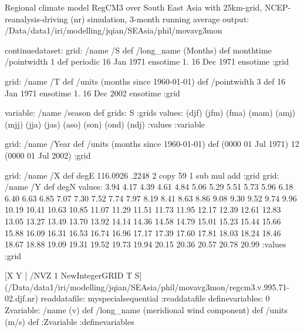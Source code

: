 Regional climate model RegCM3 over South East Asia  with 25km-grid,  NCEP-reanalysis-driving (nr) simulation, 3-month running average output:
/Data/data1/iri/modelling/jqian/SEAsia/phil/movavg3mon
\begin{ingrid}
continuedataset:
grid:
/name /S def
/long_name (Months) def
monthtime
/pointwidth 1 def
periodic
16 Jan 1971 ensotime
1.
16 Dec 1971 ensotime
:grid

grid:
/name /T def
/units (months since 1960-01-01) def
/pointwidth 3 def
16 Jan 1971 ensotime
1.
16 Dec 2002 ensotime
:grid

variable:
/name /season def
grids: S :grids
values:
(djf)
(jfm)
(fma)
(mam)
(amj)
(mjj)
(jja)
(jas)
(aso)
(son)
(ond)
(ndj)
:values
:variable

grid:
/name /Year def
/units (months since 1960-01-01) def
(0000 01 Jul 1971)
12
(0000 01 Jul 2002)
:grid

grid:
/name /X def
degE
116.0926 .2248 2 copy 59 1 sub mul add
:grid
grid:
/name /Y def
degN
values:
3.94   4.17   4.39   4.61   4.84   5.06   5.29   5.51   5.73   5.96
   6.18   6.40   6.63   6.85   7.07   7.30   7.52   7.74   7.97   8.19
   8.41   8.63   8.86   9.08   9.30   9.52   9.74   9.96  10.19  10.41
  10.63  10.85  11.07  11.29  11.51  11.73  11.95  12.17  12.39  12.61
  12.83  13.05  13.27  13.49  13.70  13.92  14.14  14.36  14.58  14.79
  15.01  15.23  15.44  15.66  15.88  16.09  16.31  16.53  16.74  16.96
  17.17  17.39  17.60  17.81  18.03  18.24  18.46  18.67  18.88  19.09
  19.31  19.52  19.73  19.94  20.15  20.36  20.57  20.78  20.99
:values
:grid
\end{ingrid}
[X    Y | /NVZ 1 NewIntegerGRID
   T S] (/Data/data1/iri/modelling/jqian/SEAsia/phil/movavg3mon/regcm3.v.995.71-02.djf.nr)
readdatafile: 
myspecialsequential
:readdatafile
definevariables:
0 Zvariable: /name (v) def /long_name (meridional wind component) def /units (m/s) def
:Zvariable
:definevariables


